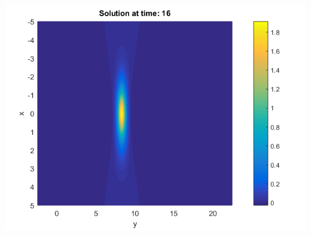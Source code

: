 \documentclass[a0,portrait]{a0poster}
\begin{document}
\begin{multicols}{2}
\begin{center}
\begin{minipage}[b]{0.30\linewidth}
		 \includegraphics[width=\linewidth]{figures/Solution_bt3_t=16.png}
	\end{minipage}


\end{center}
\end{multicols}
\end{document}
